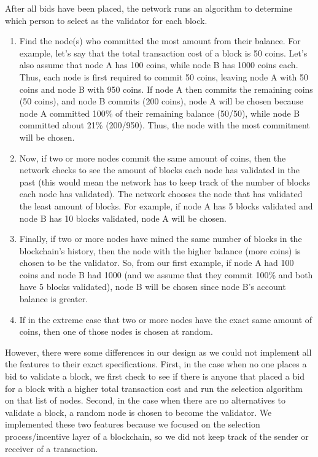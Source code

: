 After all bids have been placed, the network runs an algorithm to determine which person to select as the validator for each block.
\begin{enumerate}
\item Find the node(s) who committed the most amount from their balance. For example, let's say that the total transaction cost of a block is 50 coins. Let's also assume that node A has 100 coins, while node B has 1000 coins each. Thus, each node is first required to commit 50 coins, leaving node A with 50 coins and node B with 950 coins. If node A then commits the remaining coins (50 coins), and node B commits (200 coins), node A will be chosen because node A committed 100\% of their remaining balance (50\slash50), while node B committed about 21\% (200\slash950). Thus, the node with the most commitment will be chosen.
\item Now, if two or more nodes commit the same amount of coins, then the network checks to see the amount of blocks each node has validated in the past (this would mean the network has to keep track of the number of blocks each node has validated). The network chooses the node that has validated the least amount of blocks. For example, if node A has 5 blocks validated and node B has 10 blocks validated, node A will be chosen.
\item Finally, if two or more nodes have mined the same number of blocks in the blockchain's history, then the node with the higher balance (more coins) is chosen to be the validator. So, from our first example, if node A had 100 coins and node B had 1000 (and we assume that they commit 100\% and both have 5 blocks validated), node B will be chosen since node B's account balance is greater.
\item If in the extreme case that two or more nodes have the exact same amount of coins, then one of those nodes is chosen at random.
\end{enumerate}
\onehalfspacing
However, there were some differences in our design as we could not implement all the features to their exact specifications. First, in the case when no one places a bid to validate a block, we first check to see if there is anyone that placed a bid for a block with a higher total transaction cost and run the selection algorithm on that list of nodes. Second, in the case when there are no alternatives to validate a block, a random node is chosen to become the validator. We implemented these two features because we focused on the selection process\slash incentive layer of a blockchain, so we did not keep track of the sender or receiver of a transaction.

